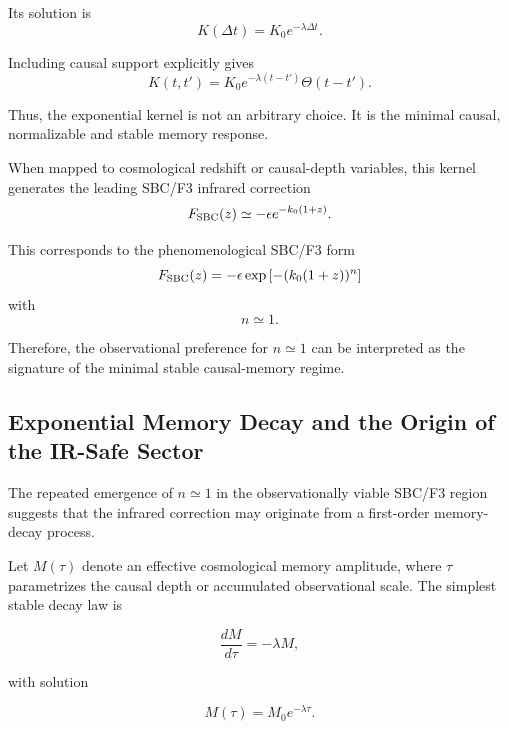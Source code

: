 Its solution is
\begin{equation}
K(\Delta t)
=
K_0 e^{-\lambda \Delta t}.
\end{equation}

Including causal support explicitly gives
\begin{equation}
K(t,t')
=
K_0 e^{-\lambda(t-t')}
\Theta(t-t') .
\end{equation}

Thus, the exponential kernel is not an arbitrary choice. It is the minimal causal, normalizable and stable memory response.

When mapped to cosmological redshift or causal-depth variables, this kernel generates the leading SBC/F3 infrared correction
\begin{equation}
F_{\rm SBC}(z)
\simeq
-\epsilon e^{-k_0(1+z)} .
\end{equation}

This corresponds to the phenomenological SBC/F3 form
\begin{equation}
F_{\rm SBC}(z)
=
-\epsilon
\exp\left[-(k_0(1+z))^n\right]
\end{equation}
with
\begin{equation}
n\simeq 1 .
\end{equation}

Therefore, the observational preference for \(n\simeq1\) can be interpreted as the signature of the minimal stable causal-memory regime.

\subsection{Exponential Memory Decay and the Origin of the IR-Safe Sector}

The repeated emergence of \(n\simeq 1\) in the observationally viable SBC/F3 region suggests that the infrared correction may originate from a first-order memory-decay process.

Let \(M(\tau)\) denote an effective cosmological memory amplitude, where \(\tau\) parametrizes the causal depth or accumulated observational scale. The simplest stable decay law is

\begin{equation}
\frac{dM}{d\tau}=-\lambda M,
\end{equation}

with solution

\begin{equation}
M(\tau)=M_0 e^{-\lambda \tau}.
\end{equation}

